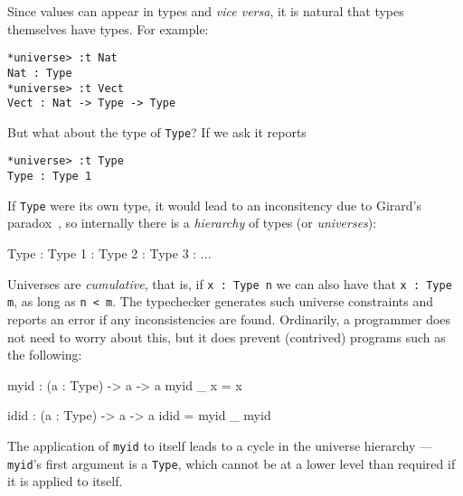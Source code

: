 Since values can appear in types and \emph{vice versa}, it is natural that types themselves
have types. For example:

\begin{lstlisting}
*universe> :t Nat
Nat : Type
*universe> :t Vect
Vect : Nat -> Type -> Type
\end{lstlisting} 

\noindent
But what about the type of \texttt{Type}? If we ask \Idris{} it reports

\begin{lstlisting}
*universe> :t Type
Type : Type 1
\end{lstlisting} 

\noindent
If \texttt{Type} were its own type, it would lead to an inconsitency
due to Girard's paradox~\cite{girard-thesis}, so internally there is a \emph{hierarchy}
of types (or \emph{universes}):

\begin{code}
Type : Type 1 : Type 2 : Type 3 : ...
\end{code} 

\noindent
Universes are \emph{cumulative}, that is, if \texttt{x : Type n} we can also have that
\texttt{x : Type m}, as long as \texttt{n < m}. 
The typechecker generates such universe 
constraints and reports an error if any inconsistencies are found. Ordinarily, a
programmer does not need to worry about this, but it does prevent (contrived)
programs such as the following:

\begin{code}
myid : (a : Type) -> a -> a
myid _ x = x

idid :  (a : Type) -> a -> a
idid = myid _ myid
\end{code} 

\noindent
The application of \texttt{myid} to itself leads to a cycle in the universe hierarchy
--- \texttt{myid}'s first argument is a \texttt{Type}, which cannot be at a lower level
than required if it is applied to itself.


